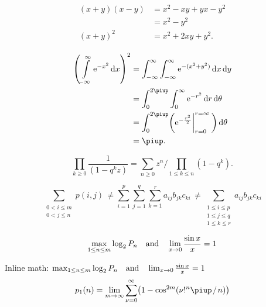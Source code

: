 \documentclass[12pt, a4paper, oneside]{article}
\newcommand{\mathup}[1]{\mathrm{#1}}
\newcommand*{\divslash}{%
	\mathbin{%
		\nonscript\mskip-2mu / \nonscript\mskip-2mu%
	}%
}  %
\theoremstyle{Plain}
\theoremstyle{Definition}
\theoremstyle{Remark}
\begin{document}
\begin{appendix}

\begin{align*}
\begin{aligned}
(x+y)(x-y)&=x^2-xy+yx-y^2\\
&=x^2-y^2\\
(x+y)^2&=x^2+2xy+y^2.
\end{aligned}
\end{align*}


\begin{align*}
\begin{aligned}
\left( \int\limits_{-\infty}^\infty \mathup{e}^{-x^2}\,\mathup{d}x \right)^2
&=\int_{-\infty}^\infty\int_{-\infty}^\infty \mathup{e}^{-(x^2+y^2)}\,\mathup{d}x\,\mathup{d}y\\
&=\int_0^{2\piup}\int_0^\infty \mathup{e}^{-r^2}\,\mathup{d}r\,\mathup{d}\theta\\
&=\int_0^{2\piup}\biggl(\mathup{e}^{-\frac{r^2}{2}}\biggl|_{r=0}^{r=\infty}\,\biggr)\,\mathup{d}\theta\\
&=\piup.
\end{aligned}
\end{align*}



$$\prod_{k\ge0}\frac{1}{(1-q^kz)}=
\sum_{n\ge0}z^n \bigg/ \!\!\prod_{1\le k\le n}(1-q^k).$$

$$\sum_{\substack{\scriptstyle 0< i\le m\\\scriptstyle0<j\le n}}p(i,j) \,\ne
%
%
\sum_{i=1}^p \sum_{j=1}^q \sum_{k=1}^r a_{ij} b_{jk} c_{ki} \,\ne
%
\sum_{\substack{\scriptstyle 1\le i\le p \\ \scriptstyle 1\le j\le q\\
		\scriptstyle 1\le k\le r}} a_{ij} b_{jk} c_{ki}$$

\medskip
$$\max_{1\le n\le m}\log_2P_n \quad \hbox{and} \quad
\lim_{x\to0}\frac{\sin x}{x}=1$$

\medskip
Inline math:
$\max_{1\le n\le m}\log_2P_n \quad \hbox{and} \quad
\lim_{x\to0}\frac{\sin x}{x}=1$
$$p_1(n)=\lim_{m\to\infty}\sum_{\nu=0}^\infty\bigl(1-\cos^{2m}(\nu!^n\piup \divslash n)\bigr)$$


\end{appendix}
\end{document}
